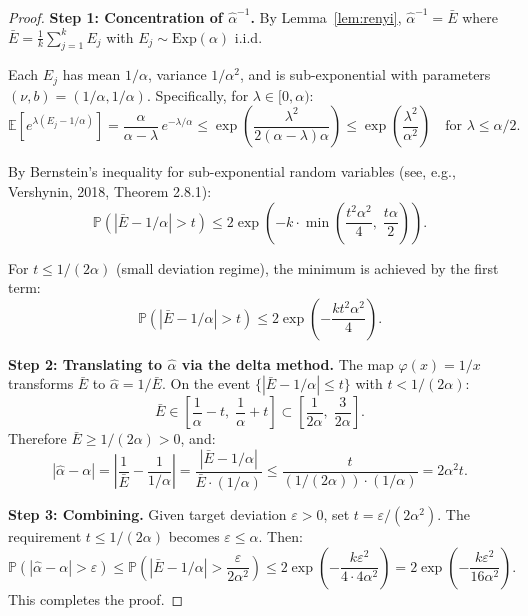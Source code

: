 \documentclass[11pt]{article}
\theoremstyle{definition}
\newcommand{\E}{\mathbb{E}}
\newcommand{\Prob}{\mathbb{P}}
\newcommand{\abs}[1]{\left| #1 \right|}
\newcommand{\ahat}{\hat{\alpha}}
\begin{document}
\begin{proof}
\textbf{Step 1: Concentration of $\ahat^{-1}$.}
By Lemma~\ref{lem:renyi}, $\ahat^{-1} = \bar{E}$ where
$\bar{E} = \frac{1}{k}\sum_{j=1}^k E_j$ with $E_j \sim \mathrm{Exp}(\alpha)$ i.i.d.

Each $E_j$ has mean $1/\alpha$, variance $1/\alpha^2$, and is sub-exponential
with parameters $(\nu, b) = (1/\alpha, 1/\alpha)$. Specifically, for
$\lambda \in [0, \alpha)$:
\[
  \E[e^{\lambda(E_j - 1/\alpha)}]
  = \frac{\alpha}{\alpha - \lambda}\, e^{-\lambda/\alpha}
  \leq \exp\!\left(\frac{\lambda^2}{2(\alpha - \lambda)\alpha}\right)
  \leq \exp\!\left(\frac{\lambda^2}{\alpha^2}\right)
  \quad\text{for } \lambda \leq \alpha/2.
\]

By Bernstein's inequality for sub-exponential random variables
(see, e.g., Vershynin, 2018, Theorem 2.8.1):
\begin{equation}\label{eq:bernstein}
  \Prob\!\left(\abs{\bar{E} - 1/\alpha} > t\right)
  \leq 2\exp\!\left(-k \cdot \min\!\left(\frac{t^2\alpha^2}{4},\;
    \frac{t\alpha}{2}\right)\right).
\end{equation}

For $t \leq 1/(2\alpha)$ (small deviation regime), the minimum is achieved
by the first term:
\begin{equation}\label{eq:bernstein_small}
  \Prob\!\left(\abs{\bar{E} - 1/\alpha} > t\right)
  \leq 2\exp\!\left(-\frac{kt^2\alpha^2}{4}\right).
\end{equation}

\textbf{Step 2: Translating to $\ahat$ via the delta method.}
The map $\varphi(x) = 1/x$ transforms $\bar{E}$ to $\ahat = 1/\bar{E}$.
On the event $\{\abs{\bar{E} - 1/\alpha} \leq t\}$ with $t < 1/(2\alpha)$:
\[
  \bar{E} \in \left[\frac{1}{\alpha} - t,\; \frac{1}{\alpha} + t\right]
  \subset \left[\frac{1}{2\alpha},\; \frac{3}{2\alpha}\right].
\]
Therefore $\bar{E} \geq 1/(2\alpha) > 0$, and:
\[
  \abs{\ahat - \alpha} = \abs{\frac{1}{\bar{E}} - \frac{1}{1/\alpha}}
  = \frac{\abs{\bar{E} - 1/\alpha}}{\bar{E} \cdot (1/\alpha)}
  \leq \frac{t}{(1/(2\alpha)) \cdot (1/\alpha)}
  = 2\alpha^2 t.
\]

\textbf{Step 3: Combining.}
Given target deviation $\varepsilon > 0$, set $t = \varepsilon/(2\alpha^2)$.
The requirement $t \leq 1/(2\alpha)$ becomes $\varepsilon \leq \alpha$.
Then:
\[
  \Prob(\abs{\ahat - \alpha} > \varepsilon)
  \leq \Prob\!\left(\abs{\bar{E} - 1/\alpha} > \frac{\varepsilon}{2\alpha^2}\right)
  \leq 2\exp\!\left(-\frac{k\varepsilon^2}{4 \cdot 4\alpha^2}\right)
  = 2\exp\!\left(-\frac{k\varepsilon^2}{16\alpha^2}\right).
\]
This completes the proof.
\end{proof}
\end{document}
